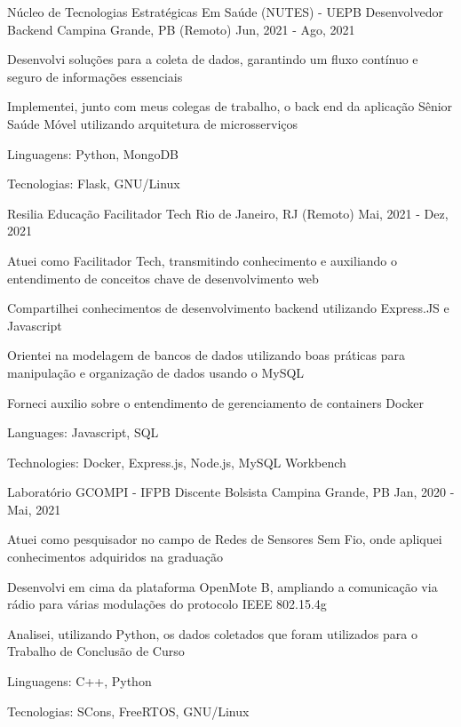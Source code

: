 \begin{cventries}
  \cventry
  {Núcleo de Tecnologias Estratégicas Em Saúde (NUTES) - UEPB} %
  {Desenvolvedor Backend} %
  {Campina Grande, PB (Remoto)} %
  {Jun, 2021 - Ago, 2021} %
  {
    \begin{cvitems} %
      \item {Desenvolvi soluções para a coleta de dados, garantindo um fluxo contínuo e seguro de informações essenciais}
      \item {Implementei, junto com meus colegas de trabalho, o back end da aplicação Sênior Saúde Móvel utilizando arquitetura de microsserviços}
      \item {Linguagens: Python, MongoDB}
      \item {Tecnologias: Flask, GNU/Linux}
    \end{cvitems}
  }

  \cventry
  {Resilia Educação} %
  {Facilitador Tech} %
  {Rio de Janeiro, RJ (Remoto)} %
  {Mai, 2021 - Dez, 2021} %
  {
    \begin{cvitems} %
      \item {Atuei como Facilitador Tech, transmitindo conhecimento e auxiliando o entendimento de conceitos chave de desenvolvimento web}
      \item {Compartilhei conhecimentos de desenvolvimento backend utilizando Express.JS e Javascript}
      \item {Orientei na modelagem de bancos de dados utilizando boas práticas para manipulação e organização de dados usando o MySQL}
      \item {Forneci auxilio sobre o entendimento de gerenciamento de containers Docker}
      \item {Languages: Javascript, SQL}
      \item {Technologies: Docker, Express.js, Node.js, MySQL Workbench}
    \end{cvitems}
  }

  \cventry
  {Laboratório GCOMPI - IFPB} %
  {Discente Bolsista} %
  {Campina Grande, PB} %
  {Jan, 2020 - Mai, 2021} %
  {
    \begin{cvitems} %
      \item {Atuei como pesquisador no campo de Redes de Sensores Sem Fio, onde apliquei conhecimentos adquiridos na graduação}
      \item {Desenvolvi em cima da plataforma OpenMote B, ampliando a comunicação via rádio para várias modulações do protocolo IEEE 802.15.4g}
      \item {Analisei, utilizando Python, os dados coletados que foram utilizados para o Trabalho de Conclusão de Curso}
      \item {Linguagens: C++, Python}
      \item {Tecnologias: SCons, FreeRTOS, GNU/Linux}
    \end{cvitems}
  }
\end{cventries}

